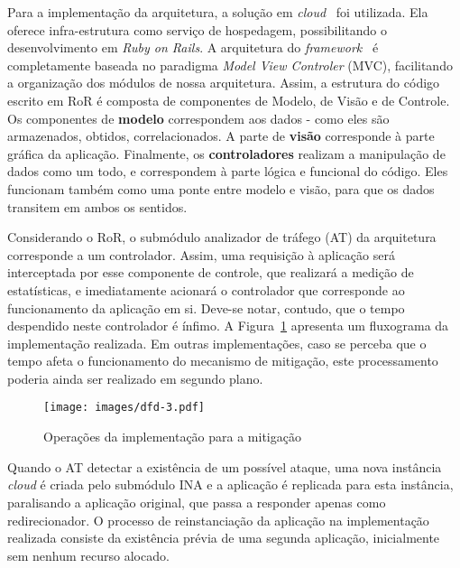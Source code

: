 Para a implementação da arquitetura, a solução em \emph{cloud}~\cite{heroku} foi utilizada. Ela oferece infra-estrutura como serviço de hospedagem, possibilitando o desenvolvimento em \emph{Ruby on Rails}. %
%
%
A arquitetura do \emph{framework}~\cite{ror} é completamente baseada no paradigma \emph{Model View Controler} (MVC), facilitando a organização dos módulos de nossa arquitetura. Assim, a estrutura do código escrito em RoR é composta de componentes de Modelo, de Visão e de Controle. Os componentes de \textbf{modelo} correspondem aos dados - como eles são armazenados, obtidos, correlacionados. A parte de \textbf{visão} corresponde à parte gráfica da aplicação. Finalmente, os \textbf{controladores} realizam a manipulação de dados como um todo, e correspondem à parte lógica e funcional do código. Eles funcionam também como uma ponte entre modelo e visão, para que os dados transitem em ambos os sentidos.
%

Considerando o RoR, o submódulo analizador de tráfego (AT) da arquitetura corresponde a um controlador. Assim, uma requisição à aplicação será interceptada por esse componente de controle, que realizará a medição de estatísticas, e imediatamente acionará o controlador que corresponde ao funcionamento da aplicação em si. Deve-se notar, contudo, que o tempo despendido neste controlador é ínfimo. 
%
A Figura~\ref{fig:dfd} apresenta um fluxograma da implementação realizada. 
%
Em outras implementações, caso se perceba que o tempo afeta o funcionamento do mecanismo de mitigação, este processamento poderia ainda ser realizado em segundo plano. 

\begin{figure}[ht!]
	\centering
	\texttt{[image: images/dfd-3.pdf]}
	\caption{Operações da implementação para a mitigação}
	\label{fig:dfd}
\end{figure}

Quando o AT detectar a existência de um possível ataque, uma nova instância \emph{cloud} é criada pelo submódulo INA e a aplicação é replicada para esta instância, paralisando a aplicação original, que passa a responder apenas como redirecionador. O processo de reinstanciação da aplicação na implementação realizada consiste da existência prévia de uma segunda aplicação, inicialmente sem nenhum recurso alocado. %

